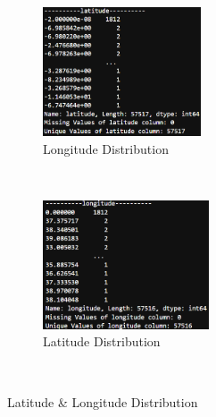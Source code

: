 \documentclass[conference]{IEEEtran}
\begin{document}
\begin{figure}[t]
    \centering
    \begin{subfigure}[t]{0.3\textwidth}
      \centering
      \includegraphics[height=1.5in]{figures/jason_latitude.png}
      \caption{Longitude Distribution}
    \end{subfigure}%
    ~
    \begin{subfigure}[t]{0.3\textwidth}
      \centering
      \includegraphics[height=1.5in]{figures/jason_longitude.png}
      \caption{Latitude Distribution}
    \end{subfigure}
    ~
    \caption{Latitude \& Longitude Distribution}
    \label{fig:lat_long_distribution}
\end{figure}
\end{document}
